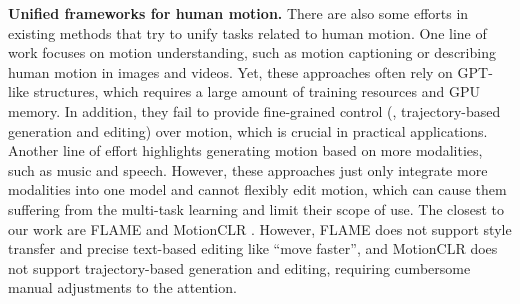 \noindent\textbf{Unified frameworks for human motion.} There are also some efforts in existing methods that try to unify tasks related to human motion. One line of work \cite{jiang2023motiongpt,jiang2025motionchain,zhou2024avatargpt,li2024unimotion,wang2024motiongpt,ling2024motionllama,wu2024motionllm,luo2024m,athanasiou2024motionfix} focuses on motion understanding, such as motion captioning or describing human motion in images and videos. Yet, these approaches often rely on GPT-like structures, which requires a large amount of training resources and GPU memory. In addition, they fail to provide fine-grained control (\eg, trajectory-based generation and editing) over motion, which is crucial in practical applications. Another line of effort \cite{shrestha2025generating,zhou2023ude,zhou2023unified,zhang2025large,yang2024unimumo,luo2024m,fan2024everything2motion,alexanderson2023listen} highlights generating motion based on more modalities, such as music and speech. However, these approaches just only integrate more modalities into one model and cannot flexibly edit motion, which can cause them suffering from the multi-task learning and limit their scope of use. The closest to our work are FLAME \cite{kim2023flame} and MotionCLR \cite{chen2024motionclr}.
However, FLAME does not support style transfer and precise text-based editing like ``move faster'', and MotionCLR does not support trajectory-based generation and editing, requiring cumbersome manual adjustments to the attention.

